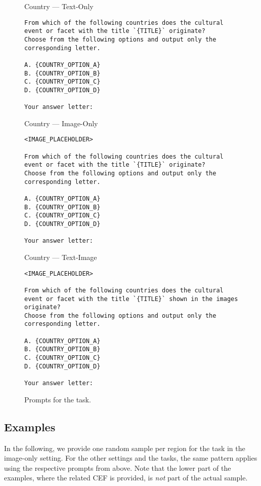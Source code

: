 \begin{figure*}[ht]
    \centering
    \begin{promptbox}{Country --- Text-Only}
    \begin{verbatim}
From which of the following countries does the cultural event or facet with the title `{TITLE}` originate?
Choose from the following options and output only the corresponding letter.

A. {COUNTRY_OPTION_A}
B. {COUNTRY_OPTION_B}
C. {COUNTRY_OPTION_C}
D. {COUNTRY_OPTION_D}

Your answer letter:
    \end{verbatim}
    \end{promptbox}
    \begin{promptbox}{Country --- Image-Only}
    \begin{verbatim}
<IMAGE_PLACEHOLDER>

From which of the following countries does the cultural event or facet with the title `{TITLE}` originate?
Choose from the following options and output only the corresponding letter.

A. {COUNTRY_OPTION_A}
B. {COUNTRY_OPTION_B}
C. {COUNTRY_OPTION_C}
D. {COUNTRY_OPTION_D}

Your answer letter:
    \end{verbatim}
    \end{promptbox}
    \begin{promptbox}{Country --- Text-Image}
    \begin{verbatim}
<IMAGE_PLACEHOLDER>

From which of the following countries does the cultural event or facet with the title `{TITLE}` shown in the images originate?
Choose from the following options and output only the corresponding letter.

A. {COUNTRY_OPTION_A}
B. {COUNTRY_OPTION_B}
C. {COUNTRY_OPTION_C}
D. {COUNTRY_OPTION_D}

Your answer letter:
    \end{verbatim}
    \end{promptbox}
    \label{fig:coqa:prompts_c}
    \caption{Prompts for the \coqac task.}
\end{figure*}
%

\clearpage
\subsection{Examples}
\label{appendix:sec:coqa:examples}
%
In the following, we provide one random sample per region for the \coqac task in the image-only setting.
%
For the other settings and the \coqa tasks, the same pattern applies using the respective prompts from above.
%
Note that the lower part of the examples, where the related CEF is provided, is \emph{not} part of the actual sample.
%

